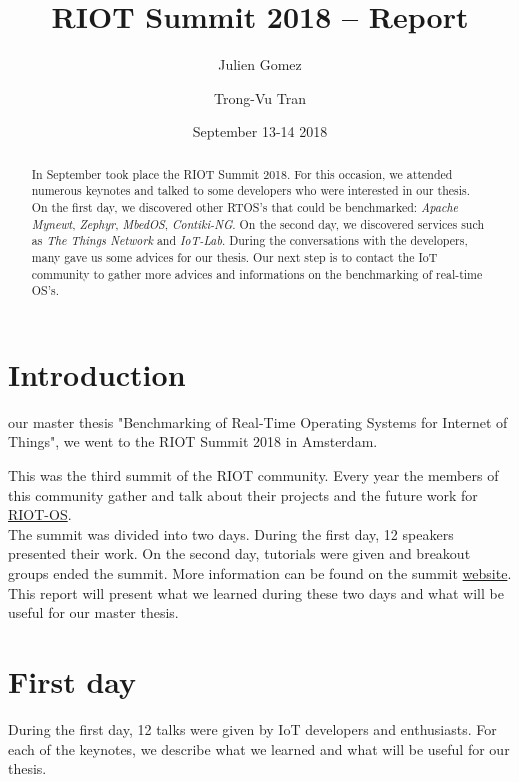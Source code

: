 \documentclass[journal, a4paper]{../IEEEtran}
\begin{document}
\title{RIOT Summit 2018 -- Report}
\author{Julien Gomez \and Trong-Vu Tran}
\date{September 13-14 2018}
\maketitle

\begin{abstract}
    In September took place the RIOT Summit 2018.
	For this occasion, we attended numerous keynotes and talked to some developers who were interested in our thesis. 
    On the first day, we discovered other RTOS's that could be benchmarked: \textit{Apache Mynewt}, \textit{Zephyr}, \textit{MbedOS}, \textit{Contiki-NG}. 
    On the second day, we discovered services such as \textit{The Things Network} and \textit{IoT-Lab}.
    During the conversations with the developers, many gave us some advices for our thesis. 
    Our next step is to contact the IoT community to gather more advices and informations on the benchmarking of real-time OS's.
\end{abstract}

\section{Introduction}
 our master thesis "Benchmarking of Real-Time Operating Systems for Internet of Things", we went to the RIOT Summit 2018 in Amsterdam.
    
This was the third summit of the RIOT community. 
Every year the members of this community gather and talk about their projects and the future work for \href{http://riot-os.org}{RIOT-OS}. \\

The summit was divided into two days. 
During the first day, 12 speakers presented their work. On the second day, tutorials were given and breakout groups ended the summit. 
More information can be found on the summit \href{http://summit.riot-os.org/2018/}{website}. \\

This report will present what we learned during these two days and what will be useful for our master thesis.

\section{First day}
During the first day, 12 talks were given by IoT developers and enthusiasts.
For each of the keynotes, we describe what we learned and what will be useful for our thesis.
\end{document}
